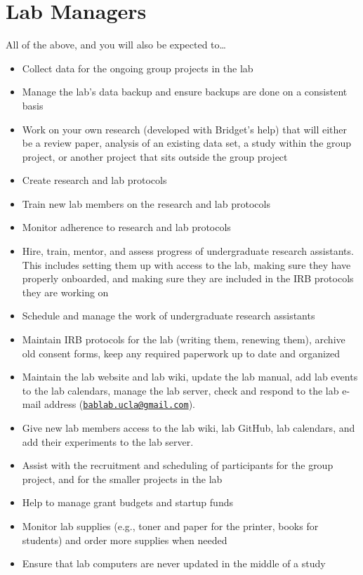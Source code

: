 \documentclass[
]{book}
\providecommand{\tightlist}{%
  \setlength{\itemsep}{0pt}\setlength{\parskip}{0pt}}
\begin{document}
\hypertarget{lab-managers}{%
\section{Lab Managers}\label{lab-managers}}

All of the above, and you will also be expected to\ldots{}

\begin{itemize}
\tightlist
\item
  Collect data for the ongoing group projects in the lab
\item
  Manage the lab's data backup and ensure backups are done on a consistent basis
\item
  Work on your own research (developed with Bridget's help) that will either be a review paper, analysis of an existing data set, a study within the group project, or another project that sits outside the group project
\item
  Create research and lab protocols
\item
  Train new lab members on the research and lab protocols
\item
  Monitor adherence to research and lab protocols
\item
  Hire, train, mentor, and assess progress of undergraduate research assistants. This includes setting them up with access to the lab, making sure they have properly onboarded, and making sure they are included in the IRB protocols they are working on
\item
  Schedule and manage the work of undergraduate research assistants
\item
  Maintain IRB protocols for the lab (writing them, renewing them), archive old consent forms, keep any required paperwork up to date and organized
\item
  Maintain the lab website and lab wiki, update the lab manual, add lab events to the lab calendars, manage the lab server, check and respond to the lab e-mail address (\href{mailto:bablab.ucla@gmail.com}{\nolinkurl{bablab.ucla@gmail.com}}).
\item
  Give new lab members access to the lab wiki, lab GitHub, lab calendars, and add their experiments to the lab server.
\item
  Assist with the recruitment and scheduling of participants for the group project, and for the smaller projects in the lab
\item
  Help to manage grant budgets and startup funds
\item
  Monitor lab supplies (e.g., toner and paper for the printer, books for students) and order more supplies when needed
\item
  Ensure that lab computers are never updated in the middle of a study
\end{itemize}
\end{document}
